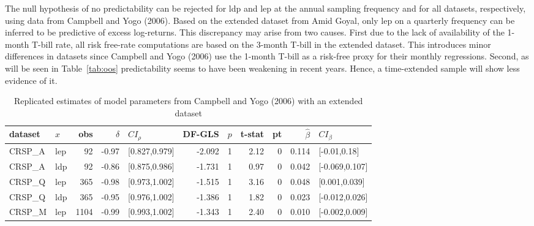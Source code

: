 \documentclass{article}
\begin{document}
The null hypothesis of no predictability can be rejected for ldp and lep at the annual sampling frequency and for all datasets, respectively, using data from Campbell and Yogo (2006). Based on the extended dataset from Amid Goyal, only lep on a quarterly frequency can be inferred to be predictive of excess log-returns. This discrepancy may arise from two causes. First due to the lack of availability of the 1-month T-bill rate, all risk free-rate computations are based on the 3-month T-bill in the extended dataset. This introduces minor differences in datasets since Campbell and Yogo (2006) use the 1-month T-bill as a risk-free proxy for their monthly regressions. Second, as will be seen in Table~\vref{tab:oos} predictability seems to have been weakening in recent years. Hence, a time-extended sample will show less evidence of it.  
\begin{table}[ht]
\centering
\caption{Replicated estimates of model parameters from Campbell and Yogo (2006) with an extended dataset}
\label{tab:extended}
\begin{threeparttable}
\begin{tabular}{llrrlrrrrrl}
  \hline
dataset & $x$ & obs & $\hat{\delta}$ & $CI_{\rho}$ & DF-GLS & $p$ &t-stat & pt & $\hat{\beta}$ & $CI_{\beta}$ \\ 
  \hline
    CRSP\_A  & lep & 92 & -0.97 & [0.827,0.979] & -2.092 & 1 & 2.12 & 0 & 0.114 & [-0.01,0.18] \\ 
    CRSP\_A  & ldp & 92 & -0.86 & [0.875,0.986] & -1.731 & 1 & 0.97 & 0 & 0.042 & [-0.069,0.107] \\ 
   CRSP\_Q & lep & 365 & -0.98 & [0.973,1.002] & -1.515 & 1 & 3.16 & 0 & 0.048 & [0.001,0.039] \\ 
  CRSP\_Q & ldp & 365 & -0.95 & [0.976,1.002] & -1.386 & 1 & 1.82 & 0 & 0.023 & [-0.012,0.026] \\ 
  CRSP\_M & lep & 1104 & -0.99 & [0.993,1.002] & -1.343 & 1 & 2.40 & 0 & 0.010 & [-0.002,0.009] \\ 

\end{tabular}
\end{threeparttable}
\end{table}
\end{document}
